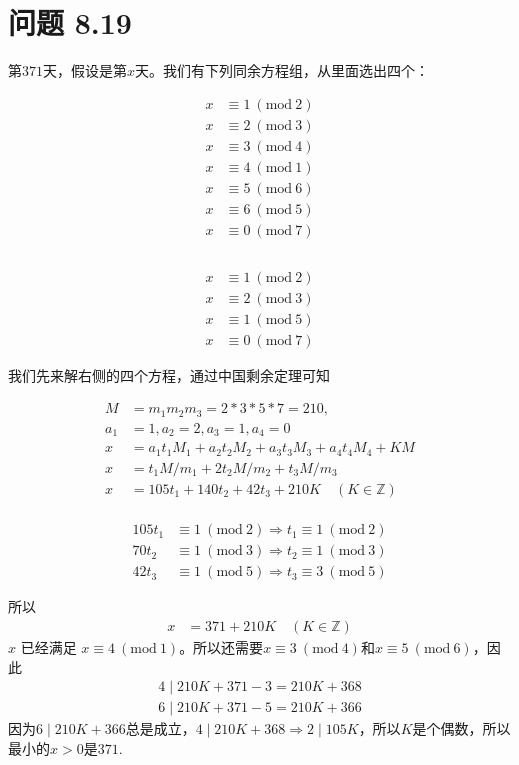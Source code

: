 \documentclass[acmlarge,screen]{acmart}
\begin{document}
\section{问题 8.19}
第$371$天，假设是第$x$天。我们有下列同余方程组，从里面选出四个：
\begin{multicols}{2}
\begin{align*} 
	x&\equiv1\ (\text{mod}\ 2)\\
	x&\equiv2\ (\text{mod}\ 3)\\
	x&\equiv3\ (\text{mod}\ 4)\\
	x&\equiv4\ (\text{mod}\ 1)\\
	x&\equiv5\ (\text{mod}\ 6)\\
	x&\equiv6\ (\text{mod}\ 5)\\
	x&\equiv0\ (\text{mod}\ 7)\\
\end{align*}
\columnbreak \\
\begin{align*}
	x&\equiv1\ (\text{mod}\ 2)\\
	x&\equiv2\ (\text{mod}\ 3)\\
	x&\equiv1\ (\text{mod}\ 5)\\
	x&\equiv0\ (\text{mod}\ 7)
\end{align*}
\end{multicols}
\noindent 我们先来解右侧的四个方程，通过中国剩余定理可知
\begin{multicols}{2}
\begin{align*}
	M&=m_1m_2m_3=2*3*5*7=210,\\
	a_1&=1,a_2=2,a_3=1,a_4=0\\
	x&=a_1t_1M_1+a_2t_2M_2+a_3t_3M_3+a_4t_4M_4+KM\\
	x&=t_1M/m_1+2t_2M/m_2+t_3M/m_3\\
	x&=105t_1+140t_2+42t_3+210K\quad(K \in \mathbb{Z})
\end{align*}
\columnbreak\\
\begin{align*}
	105t_1&\equiv1\ (\text{mod}\ 2)\Rightarrow t_1\equiv1\ (\text{mod}\ 2)\\
	70t_2&\equiv1\ (\text{mod}\ 3)\Rightarrow t_2\equiv1\ (\text{mod}\ 3)\\
	42t_3&\equiv1\ (\text{mod}\ 5)\Rightarrow t_3\equiv3\ (\text{mod}\ 5)
\end{align*}
\end{multicols}
\noindent 所以
\begin{align*}
	x&=371+210K\quad(K \in \mathbb{Z})
\end{align*}
$x$ 已经满足 $x\equiv4\ (\text{mod}\ 1)$。所以还需要$x\equiv3\ (\text{mod}\ 4)$和$x\equiv5\ (\text{mod}\ 6)$，因此
\begin{align*}
4\mid 210K+371-3=210K+368\\
6\mid 210K+371-5=210K+366
\end{align*}
因为$6\mid 210K+366$总是成立，$4\mid210K+368 \Rightarrow 2\mid105K$，所以$K$是个偶数，所以最小的$x>0$是$371$.
\end{document}
